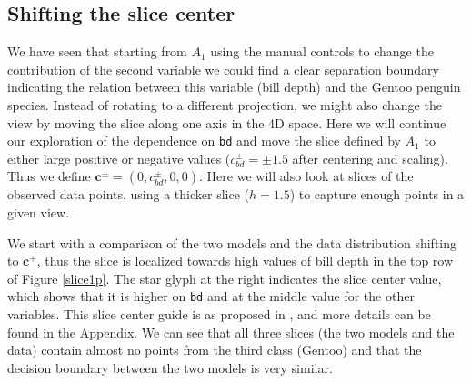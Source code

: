 \documentclass[]{interact}
\theoremstyle{plain}%
\theoremstyle{definition}
\theoremstyle{remark}
\begin{document}
\hypertarget{shifting-the-slice-center}{%
\subsection{Shifting the slice center}\label{shifting-the-slice-center}}

We have seen that starting from \(A_1\) using the manual controls to
change the contribution of the second variable we could find a clear
separation boundary indicating the relation between this variable (bill
depth) and the Gentoo penguin species. Instead of rotating to a
different projection, we might also change the view by moving the slice
along one axis in the 4D space. Here we will continue our exploration of
the dependence on \texttt{bd} and move the slice defined by \(A_1\) to
either large positive or negative values (\(c^{\pm}_{bd} = \pm 1.5\)
after centering and scaling). Thus we define
\(\mathbf{c}^{\pm} = (0, c^{\pm}_{bd}, 0, 0)\). Here we will also look
at slices of the observed data points, using a thicker slice (\(h=1.5\))
to capture enough points in a given view.

We start with a comparison of the two models and the data distribution
shifting to \(\mathbf{c}^{+}\), thus the slice is localized towards high
values of bill depth in the top row of Figure \ref{slice1p}. The star
glyph at the right indicates the slice center value, which shows that it
is higher on \texttt{bd} and at the middle value for the other
variables. This slice center guide is as proposed in \citet{condviz2},
and more details can be found in the Appendix. We can see that all three
slices (the two models and the data) contain almost no points from the
third class (Gentoo) and that the decision boundary between the two
models is very similar.
\end{document}
